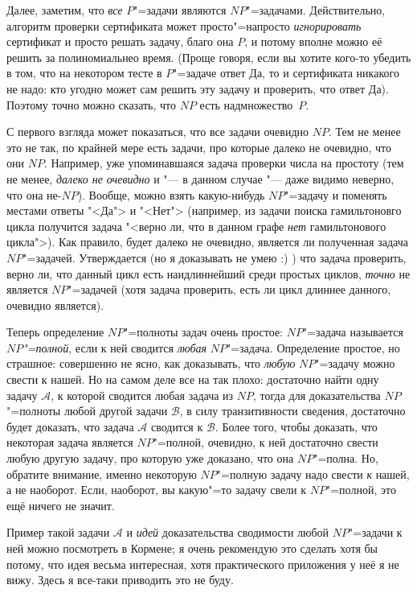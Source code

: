\documentclass[a4paper,10pt]{problems}
\newcommand{\A}{{\ensuremath{\mathcal{A}}}}
\newcommand{\B}{{\ensuremath{\mathcal{B}}}}
\begin{document}
Далее, заметим, что \textit{все} $P$"=задачи являются $NP$"=задачами. 
Действительно, алгоритм проверки сертификата может просто"=напросто 
\textit{игнорировать} сертификат и просто решать задачу, благо она $P$, и 
потому вполне можно её решить за полиномиальнео время. (Проще говоря, если вы 
хотите кого-то убедить в том, что на некотором тесте в $P$"=задаче ответ Да, то 
и сертификата никакого не надо: кто угодно может сам решить эту задачу и 
проверить, что ответ Да). Поэтому точно можно сказать, что $NP$ есть 
надмножество~$P$.

 С первого взгляда может показаться, что все 
задачи очевидно $NP$. Тем не менее это не так, по крайней мере есть задачи, про 
которые далеко не очевидно, что они $NP$. Например, уже упоминавшаяся задача 
проверки числа на простоту (тем не менее, \textit{далеко не очевидно} и "--- в 
данном случае "--- даже видимо неверно, что она не-$NP$). Вообще, можно взять 
какую-нибудь $NP$"=задачу и поменять местами ответы "<Да"> и "<Нет"> 
(например, из задачи поиска гамильтоновго цикла получится задача "<верно ли, что 
в данном графе \textit{нет} гамильтонового цикла">). Как 
правило, будет далеко не очевидно, является ли полученная задача $NP$"=задачей. 
Утверждается (но я доказывать не умею :) ) что задача проверить, 
верно ли, что данный цикл есть наидлиннейший среди простых циклов, 
\textit{точно} не является $NP$"=задачей (хотя задача проверить, есть ли цикл 
длиннее данного, очевидно является).

 Теперь определение $NP$"=полноты задач очень простое: 
$NP$"=задача называется \textit{$NP$"=полной}, если к ней сводится \textit{любая} 
$NP$"=задача. Определение простое, но страшное: совершенно не ясно, как 
доказывать, что \textit{любую} $NP$"=задачу можно свести к нашей. Но на самом 
деле все на так плохо: достаточно найти одну задачу \A, к которой сводится 
любая задача из $NP$, тогда для доказательства $NP$"=полноты любой другой 
задачи \B{}, в силу транзитивности сведения, достаточно будет доказать, что задача \A{} сводится к \B. Более 
того, чтобы доказать, что некоторая задача является $NP$"=полной, очевидно, 
к ней достаточно свести любую другую задачу, про которую уже доказано, что она 
$NP$"=полна. Но, обратите внимание, именно некоторую $NP$"=полную задачу надо свести 
\textit{к} нашей, а не наоборот. Если, наоборот, вы какую"=то задачу свели к 
$NP$"=полной, это ещё ничего не значит.

Пример такой задачи \A{} и \textit{идей} доказательства сводимости любой 
$NP$"=задачи к ней можно посмотреть в Кормене; я очень рекомендую это сделать 
хотя бы потому, что идея весьма интересная, хотя практического приложения у неё 
я не вижу. Здесь я все-таки приводить это не буду.
\end{document}
